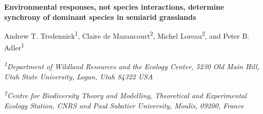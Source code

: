 \documentclass[12pt,]{article}
\title{}
\author{}
\date{}
\begin{document}
\maketitle







\begin{center}
\large{\textbf{Environmental responses, not species interactions, determine synchrony of dominant species in semiarid grasslands}}

\renewcommand*{\thefootnote}{\fnsymbol{footnote}}

\vspace{1em}

\normalsize{Andrew T. Tredennick\textsuperscript{1}, Claire de Mazancourt\textsuperscript{2}, Michel Loreau\textsuperscript{2}, and Peter B. Adler\textsuperscript{1}}

\vspace{1em}

\textit{\small{\textsuperscript{1}Department of Wildland Resources and the Ecology Center, 5230 Old Main Hill, Utah State University, Logan, Utah 84322 USA}}

\textit{\small{\textsuperscript{2}Centre for Biodiversity Theory and Modelling, Theoretical and Experimental Ecology Station, CNRS and Paul Sabatier University, Moulis, 09200, France}}

\end{center}

\renewcommand*{\thefootnote}{\arabic{footnote}}

\setcounter{footnote}{0}



\renewcommand{\abstractname}{\vspace{-\baselineskip}}
\end{document}
